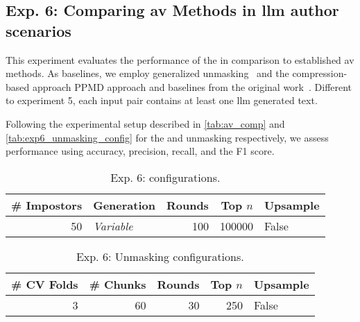 \subsection{Exp. 6: Comparing \ac{av} Methods in \acs{llm} author scenarios}

This experiment evaluates the performance of the \impAppr{} in comparison to established \ac{av} methods.
As baselines, we employ generalized unmasking~\citep{bevendorff_generalizing_2019} and the compression-based approach PPMD approach and baselines from the original work~\citep{koppel_determining_2014}.
Different to experiment 5, each input pair contains at least one \ac{llm} generated text.

Following the experimental setup described in \autoref{tab:av_comp} and \autoref{tab:exp6_unmasking_config} for the \impAppr{} and unmasking respectively, we assess performance using  accuracy, precision, recall, and the F1 score. 

\begin{table}[h]
\centering\small
\caption{Exp. 6: \impAppr{} configurations.}
\label{tab:av_comp}
\begin{tabular}{@{}rlrrl@{}}   %
\toprule
\# Impostors & Generation & Rounds & Top $n$ & Upsample \\
\midrule
50 & \textit{Variable} & 100 & \num{100000} & False \\
\bottomrule
\end{tabular}%
\end{table}

\begin{table}[h]
\centering\small
\caption{Exp. 6: Unmasking configurations.}
\label{tab:exp6_unmasking_config}
\begin{tabular}{@{}rrrrl@{}}   %
\toprule
\# CV Folds & \# Chunks & Rounds & Top $n$ & Upsample \\
\midrule
3 & 60 & 30 & \num{250} & False \\
\bottomrule
\end{tabular}%
\end{table}